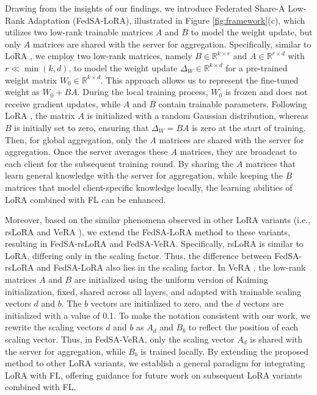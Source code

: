 \documentclass{article} %
\begin{document}
Drawing from the insights of our findings, we introduce Federated Share-A Low-Rank Adaptation (FedSA-LoRA), illustrated in Figure \ref{fig:framework}(c), which utilizes two low-rank trainable matrices $A$ and $B$ to model the weight update, but only $A$ matrices are shared with the server for aggregation. Specifically, similar to LoRA \citep{hulora}, we employ two low-rank matrices, namely $B \in \mathbb{R}^{k \times r}$ and $A \in \mathbb{R}^{r \times d}$ with $r \ll \min(k, d)$, to model the weight update $\Delta_W \in \mathbb{R}^{k \times d}$ for a pre-trained weight matrix $W_0 \in \mathbb{R}^{k \times d}$. This approach allows us to represent the fine-tuned weight as $W_0 + BA$. During the local training process, $W_0$ is frozen and does not receive gradient updates, while $A$ and $B$ contain trainable parameters. Following LoRA \citep{hulora}, the matrix $A$ is initialized with a random Gaussian distribution, whereas $B$ is initially set to zero, ensuring that $\Delta_W = BA$ is zero at the start of training. Then, for global aggregation, only the $A$ matrices are shared with the server for aggregation. Once the server averages these $A$ matrices, they are broadcast to each client for the subsequent training round. By sharing the $A$ matrices that learn general knowledge with the server for aggregation, while keeping the $B$ matrices that model client-specific knowledge locally, the learning abilities of LoRA combined with FL can be enhanced.

Moreover, based on the similar phenomena observed in other LoRA variants (i.e., rsLoRA \citep{kalajdzievski2023rank} and VeRA \citep{kopiczko2024vera}), we extend the FedSA-LoRA method to these variants, resulting in FedSA-rsLoRA and FedSA-VeRA. Specifically, rsLoRA \citep{kalajdzievski2023rank} is similar to LoRA, differing only in the scaling factor. Thus, the difference between FedSA-rsLoRA and FedSA-LoRA also lies in the scaling factor. In VeRA \citep{kopiczko2024vera}, the low-rank matrices $A$ and $B$ are initialized using the uniform version of Kaiming initialization, fixed, shared across all layers, and adapted with trainable scaling vectors $d$ and $b$. The $b$ vectors are initialized to zero, and the $d$ vectors are initialized with a value of 0.1. To make the notation consistent with our work, we rewrite the scaling vectors $d$ and $b$ as $A_d$ and $B_b$ to reflect the position of each scaling vector. Thus, in FedSA-VeRA, only the scaling vector $A_d$ is shared with the server for aggregation, while $B_b$ is trained locally. By extending the proposed method to other LoRA variants, we establish a general paradigm for integrating LoRA with FL, offering guidance for future work on subsequent LoRA variants combined with FL.
\end{document}
